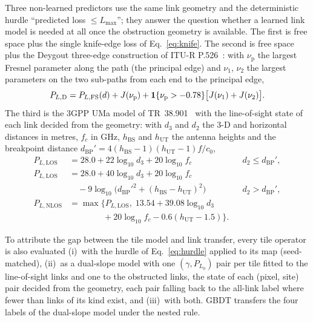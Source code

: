 Three non-learned predictors use the same link geometry and the
deterministic hurdle ``predicted loss $\le L_{\max}$''; they answer the
question whether a learned link model is needed at all once the obstruction
geometry is available. The first is free space plus the single knife-edge
loss of Eq.~\eqref{eq:knife}. The second is free space plus the Deygout
three-edge construction of ITU-R P.526~\cite{itup526}: with $\nu_{\mathrm{p}}$
the largest Fresnel parameter along the path (the principal edge) and
$\nu_{1}$, $\nu_{2}$ the largest parameters on the two sub-paths from each
end to the principal edge,
\begin{equation}
P_{L,\mathrm{D}}=P_{L,\mathrm{FS}}(d)+J(\nu_{\mathrm{p}})+\mathbf{1}\{\nu_{\mathrm{p}}>-0.78\}\bigl[J(\nu_{1})+J(\nu_{2})\bigr].
\label{eq:deygout}
\end{equation}
The third is the 3GPP UMa model of TR~38.901~\cite{tr38901} with the
line-of-sight state of each link decided from the geometry: with $d_{3}$
and $d_{2}$ the 3-D and horizontal distances in metres, $f_c$ in GHz,
$h_{\mathrm{BS}}$ and $h_{\mathrm{UT}}$ the antenna heights and the
breakpoint distance $d_{\mathrm{BP}}'=4(h_{\mathrm{BS}}-1)(h_{\mathrm{UT}}-1)f/c_0$,
\begin{equation}
\begin{aligned}
P_{L,\mathrm{LOS}}&=28.0+22\log_{10}d_{3}+20\log_{10}f_c
&& d_{2}\le d_{\mathrm{BP}}',\\
P_{L,\mathrm{LOS}}&=28.0+40\log_{10}d_{3}+20\log_{10}f_c\\
&\quad-9\log_{10}\bigl(d_{\mathrm{BP}}'^{2}+(h_{\mathrm{BS}}-h_{\mathrm{UT}})^{2}\bigr)
&& d_{2}>d_{\mathrm{BP}}',\\
P_{L,\mathrm{NLOS}}&=\max\bigl\{P_{L,\mathrm{LOS}},\;13.54+39.08\log_{10}d_{3}\\
&\qquad\qquad+20\log_{10}f_c-0.6(h_{\mathrm{UT}}-1.5)\bigr\}.
\end{aligned}
\label{eq:uma}
\end{equation}

To attribute the gap between the tile model and link transfer, every tile
operator is also evaluated (i)~with the hurdle of Eq.~\eqref{eq:hurdle}
applied to its map (seed-matched), (ii)~as a dual-slope model with one
$(\gamma,P_{L_0})$ pair per tile fitted to the line-of-sight links and one
to the obstructed links, the state of each (pixel, site) pair decided from
the geometry, each pair falling back to the all-link label where fewer than
\minLinks{} links of its kind exist, and (iii)~with both. GBDT transfers
the four labels of the dual-slope model under the nested rule.

